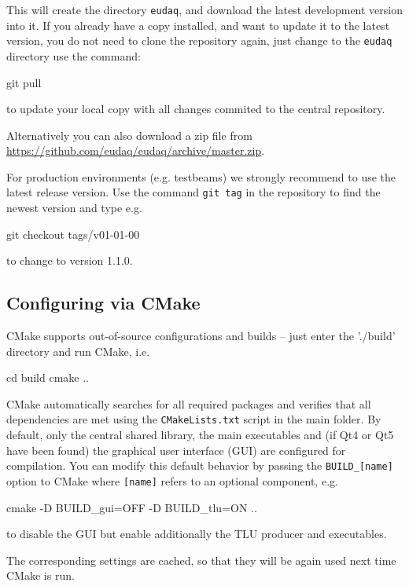 This will create the directory \texttt{eudaq}, and download the latest
development version into it. 
If you already have a copy installed, and want to update it to the
latest version, you do not need to clone the repository again, just change to the \texttt{eudaq} directory use the command:
\begin{listing}[mybash]
git pull
\end{listing}
to update your local copy with all changes commited to the central repository.

Alternatively you can also download a zip file from
\url{https://github.com/eudaq/eudaq/archive/master.zip}.

For production environments (e.g. testbeams) we strongly recommend to
use the latest release version. Use the command \texttt{git tag} in
the repository to find the newest version and type e.g. 
\begin{listing}[mybash]
git checkout tags/v01-01-00
\end{listing}
to change to version 1.1.0.

\subsection{Configuring via CMake}
CMake supports out-of-source configurations and builds -- just enter
the './build' directory and run CMake, i.e.
\begin{listing}[mybash]
cd build
cmake ..
\end{listing}

CMake automatically searches for all required packages and verifies
that all dependencies are met using the \texttt{CMakeLists.txt} script in the
main folder. By default, only the central shared library, the main
executables and (if Qt4 or Qt5 have been found) the graphical user
interface (GUI) are configured for compilation. You can modify this
default behavior by passing the \texttt{BUILD\_[name]} option to
CMake where \texttt{[name]} refers to an optional component, e.g.
\begin{listing}[mybash]
cmake -D BUILD_gui=OFF -D BUILD_tlu=ON ..
\end{listing}
to disable the GUI but enable additionally the TLU producer and
executables.

The corresponding settings are cached, so that they will be again used
next time CMake is run.


